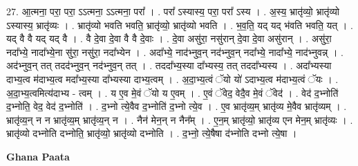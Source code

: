 \documentclass[17pt]{extarticle}
\begin{document}
27. आ॒त्मना॒ परा॒ परा॒ ऽऽत्मना॒ ऽऽत्मना॒ परा᳚ । . परा᳚ ऽस्यास्य॒ परा॒ परा᳚ ऽस्य । . अ॒स्य॒ भ्रातृ॑व्यो॒ भ्रातृ॑व्यो ऽस्यास्य॒ भ्रातृ॑व्यः । . भ्रातृ॑व्यो भवति भवति॒ भ्रातृ॑व्यो॒ भ्रातृ॑व्यो भवति । . भ॒व॒ति॒ यद् यद् भ॑वति भवति॒ यत् । . यद् वै वै यद् यद् वै । . वै दे॒वा दे॒वा वै वै दे॒वाः । . दे॒वा असु॑रा॒ नसु॑रान् दे॒वा दे॒वा असु॑रान् । . असु॑रा॒ नदा᳚भ्ये॒ नादा᳚भ्ये॒ना सु॑रा॒ नसु॑रा॒ नदा᳚भ्येन । . अदा᳚भ्ये॒ नाद॑भ्नुव॒न् नद॑भ्नुव॒न् नदा᳚भ्ये॒ नादा᳚भ्ये॒ नाद॑भ्नुवन्न् । . अद॑भ्नुव॒न् तत् तदद॑भ्नुव॒न् नद॑भ्नुव॒न् तत् । . तददा᳚भ्य॒स्या दा᳚भ्यस्य॒ तत् तददा᳚भ्यस्य । . अदा᳚भ्यस्या दाभ्य॒त्व म॑दाभ्य॒त्व मदा᳚भ्य॒स्या दा᳚भ्यस्या दाभ्य॒त्वम् । . अ॒दा॒भ्य॒त्वं ॅयो यो॑ ऽदाभ्य॒त्व म॑दाभ्य॒त्वं ॅयः । . अ॒दा॒भ्य॒त्वमित्य॑दाभ्य - त्वम् । . य ए॒व मे॒वं ॅयो य ए॒वम् । . ए॒वं ॅवेद॒ वेदै॒व मे॒वं ॅवेद॑ । . वेद॑ द॒भ्नोति॑ द॒भ्नोति॒ वेद॒ वेद॑ द॒भ्नोति॑ । . द॒भ्नो त्ये॒वैव द॒भ्नोति॑ द॒भ्नो त्ये॒व । . ए॒व भ्रातृ॑व्य॒म् भ्रातृ॑व्य मे॒वैव भ्रातृ॑व्यम् । . भ्रातृ॑व्य॒न् न न भ्रातृ॑व्य॒म् भ्रातृ॑व्य॒न् न । . नैन॑ मेन॒न् न नैन᳚म् । . ए॒न॒म् भ्रातृ॑व्यो॒ भ्रातृ॑व्य एन मेन॒म् भ्रातृ॑व्यः । . भ्रातृ॑व्यो दभ्नोति दभ्नोति॒ भ्रातृ॑व्यो॒ भ्रातृ॑व्यो दभ्नोति । . द॒भ्नो॒ त्ये॒षैषा द॑भ्नोति दभ्नो त्ये॒षा । \newline

\textbf{Ghana Paata } \newline
\end{document}
